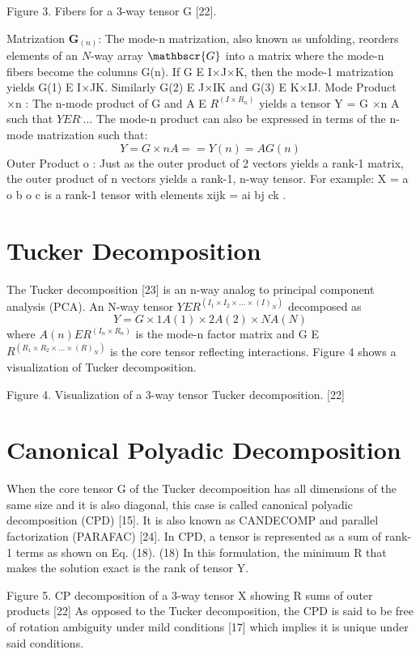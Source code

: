 Figure 3.  Fibers for a 3-way tensor G [22].

Matrization $\mathbf{G}_{(n)}$:	The mode-n matrization, also known as unfolding, reorders elements of an $N$-way array $\mathbscr{G}$ into a matrix where the mode-n fibers become the columns G(n).  If G E I×J×K, then the mode-1 matrization yields G(1) E I×JK.  Similarly G(2) E J×IK and G(3) E K×IJ.
Mode Product ×n :	The n-mode product of G and A E $ R^(I×R_n )$ yields a tensor Y = G ×n A such that $Y E R^....$  The mode-n product can also be expressed in terms of the n-mode matrization such that:
\begin{equation}
	Y = G ×n A  ==  Y(n) = AG(n)
\end{equation}
Outer Product o :	Just as the outer product of 2 vectors yields a rank-1 matrix, the outer product of n vectors yields a rank-1, n-way tensor.  For example: X = a o b o c  is a rank-1 tensor with elements xijk = ai bj ck . 

\section{Tucker Decomposition}
The Tucker decomposition [23] is an n-way analog to principal component analysis (PCA).  An N-way tensor $Y E R^(I_1×I_2×…×( I)_N )$ decomposed as
\begin{equation}
	Y=G×1A(1)×2 A(2)×NA(N)
\end{equation}
where $A(n) E R^(I_n×R_n )$ is the mode-n factor matrix and G E $R^(R_1×R_2×…×(R)_N )$ is the core tensor reflecting interactions.  Figure 4 shows a visualization of Tucker decomposition.

Figure 4. Visualization of a 3-way tensor Tucker decomposition. [22]

\section{Canonical Polyadic Decomposition}
When the core tensor G of the Tucker decomposition has all dimensions of the same size and it is also diagonal, this case is called canonical polyadic decomposition (CPD) [15].  It is also known as CANDECOMP and parallel factorization (PARAFAC) [24].   In CPD, a tensor is represented as a sum of rank-1 terms as shown on Eq. (18).
(18)
In this formulation, the minimum R that makes the solution exact is the rank of tensor Y.

Figure 5.  CP decomposition of a 3-way tensor X showing R sums of  outer products [22]
As opposed to the Tucker decomposition, the CPD is said to be free of rotation ambiguity under mild conditions [17] which implies it is unique under said conditions.

